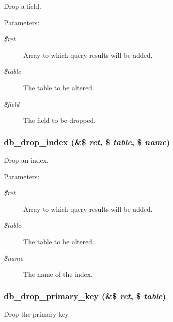 Drop a field.

\begin{Desc}
\item[Parameters:]
\begin{description}
\item[{\em \$ret}]Array to which query results will be added. \item[{\em \$table}]The table to be altered. \item[{\em \$field}]The field to be dropped. \end{description}
\end{Desc}
\hypertarget{group__schemaapi_g3a9c0b20502c5afb8177be5753f8cdbb}{
\subsubsection[{db\_\-drop\_\-index}]{\setlength{\rightskip}{0pt plus 5cm}db\_\-drop\_\-index (\&\$ {\em ret}, \/  \$ {\em table}, \/  \$ {\em name})}}
\label{group__schemaapi_g3a9c0b20502c5afb8177be5753f8cdbb}


Drop an index.

\begin{Desc}
\item[Parameters:]
\begin{description}
\item[{\em \$ret}]Array to which query results will be added. \item[{\em \$table}]The table to be altered. \item[{\em \$name}]The name of the index. \end{description}
\end{Desc}
\hypertarget{group__schemaapi_gb8ee0e7e9ca04e60ec8b0464a247425d}{
\subsubsection[{db\_\-drop\_\-primary\_\-key}]{\setlength{\rightskip}{0pt plus 5cm}db\_\-drop\_\-primary\_\-key (\&\$ {\em ret}, \/  \$ {\em table})}}
\label{group__schemaapi_gb8ee0e7e9ca04e60ec8b0464a247425d}


Drop the primary key.


